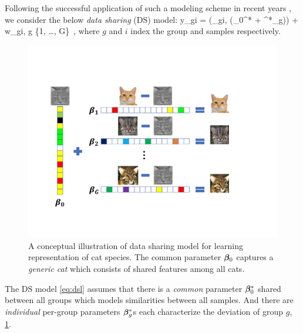 Following the successful application of such a modeling scheme in recent years \cite{domu16, grti16,  olvi14, olvi15}, we consider the below \emph{data sharing} (DS) model: 
\beq
\label{eq:dsl}
y_{gi} = \phi(\x_{gi}, (\bbeta_0^* + \bbeta^*_g)) + w_{gi}, \quad g \in \{1, \dots, G\}~,
\eeq
where $g$ and $i$ index the group and samples respectively. 
\begin{figure}%
	\centering
	\includegraphics[scale=.45]{./img/concept.pdf}
	\caption{A conceptual illustration of data sharing model for learning representation of  cat species. The common parameter $\boldsymbol{\beta}_0$ captures a \emph{generic cat} which consists of shared features among all cats.}
	\label{fig:cat}		
\end{figure}
The DS model \cref{eq:dsl} assumes that there is a \emph{common} parameter $\boldsymbol{\beta}^*_0$ shared between all groups which models similarities between all samples. And there are \emph{individual} per-group parameters $\boldsymbol{\beta}_g^*$s each characterize the deviation of group $g$, \cref{fig:cat}.%

